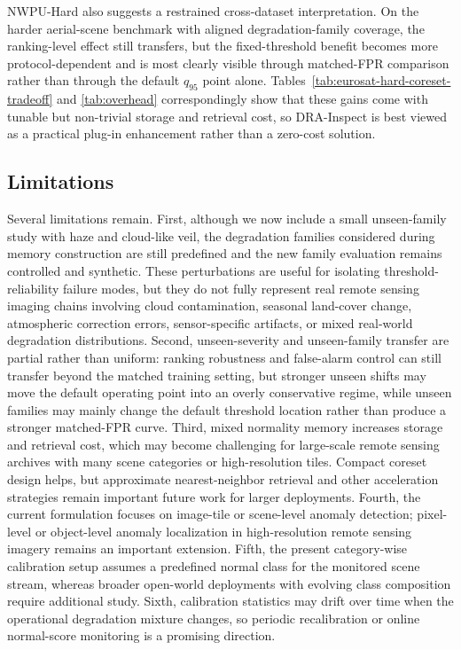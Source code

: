 \documentclass[remotesensing,article,submit,pdftex,moreauthors]{Definitions/mdpi}
\begin{document}
NWPU-Hard also suggests a restrained cross-dataset interpretation. On the harder aerial-scene benchmark with aligned degradation-family coverage, the ranking-level effect still transfers, but the fixed-threshold benefit becomes more protocol-dependent and is most clearly visible through matched-FPR comparison rather than through the default $q_{95}$ point alone. Tables~\ref{tab:eurosat-hard-coreset-tradeoff} and \ref{tab:overhead} correspondingly show that these gains come with tunable but non-trivial storage and retrieval cost, so DRA-Inspect is best viewed as a practical plug-in enhancement rather than a zero-cost solution.

\subsection{Limitations}
Several limitations remain. First, although we now include a small unseen-family study with haze and cloud-like veil, the degradation families considered during memory construction are still predefined and the new family evaluation remains controlled and synthetic. These perturbations are useful for isolating threshold-reliability failure modes, but they do not fully represent real remote sensing imaging chains involving cloud contamination, seasonal land-cover change, atmospheric correction errors, sensor-specific artifacts, or mixed real-world degradation distributions. Second, unseen-severity and unseen-family transfer are partial rather than uniform: ranking robustness and false-alarm control can still transfer beyond the matched training setting, but stronger unseen shifts may move the default operating point into an overly conservative regime, while unseen families may mainly change the default threshold location rather than produce a stronger matched-FPR curve. Third, mixed normality memory increases storage and retrieval cost, which may become challenging for large-scale remote sensing archives with many scene categories or high-resolution tiles. Compact coreset design helps, but approximate nearest-neighbor retrieval and other acceleration strategies remain important future work for larger deployments. Fourth, the current formulation focuses on image-tile or scene-level anomaly detection; pixel-level or object-level anomaly localization in high-resolution remote sensing imagery remains an important extension. Fifth, the present category-wise calibration setup assumes a predefined normal class for the monitored scene stream, whereas broader open-world deployments with evolving class composition require additional study. Sixth, calibration statistics may drift over time when the operational degradation mixture changes, so periodic recalibration or online normal-score monitoring is a promising direction.
\end{document}
